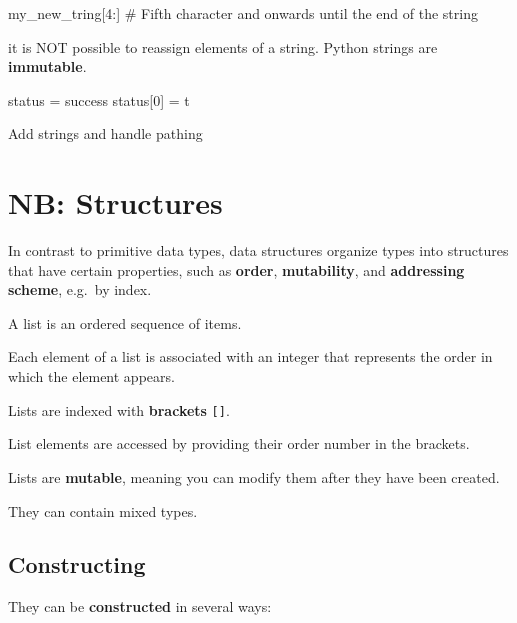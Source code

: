 \documentclass[
  letterpaper,
  DIV=11,
  numbers=noendperiod]{scrreprt}
\newenvironment{Shaded}{\begin{snugshade}}{\end{snugshade}}
\newcommand{\CommentTok}[1]{\textcolor[rgb]{0.37,0.37,0.37}{#1}}
\newcommand{\DecValTok}[1]{\textcolor[rgb]{0.68,0.00,0.00}{#1}}
\newcommand{\NormalTok}[1]{\textcolor[rgb]{0.00,0.23,0.31}{#1}}
\newcommand{\OperatorTok}[1]{\textcolor[rgb]{0.37,0.37,0.37}{#1}}
\newcommand{\StringTok}[1]{\textcolor[rgb]{0.13,0.47,0.30}{#1}}
\begin{document}
\begin{Shaded}
\begin{Highlighting}[]
\NormalTok{my\_new\_tring[}\DecValTok{4}\NormalTok{:]  }\CommentTok{\# Fifth character and onwards until the end of the string}
\end{Highlighting}
\end{Shaded}

it is NOT possible to reassign elements of a string. Python strings are
\textbf{immutable}.

\begin{Shaded}
\begin{Highlighting}[]
\NormalTok{status }\OperatorTok{=} \StringTok{\textquotesingle{}success\textquotesingle{}}
\NormalTok{status[}\DecValTok{0}\NormalTok{] }\OperatorTok{=} \StringTok{\textquotesingle{}t\textquotesingle{}}
\end{Highlighting}
\end{Shaded}

Add strings and handle pathing

\hypertarget{nb-structures}{%
\chapter{NB: Structures}\label{nb-structures}}

In contrast to primitive data types, data structures organize types into
structures that have certain properties, such as \textbf{order},
\textbf{mutability}, and \textbf{addressing scheme}, e.g.~by index.

A list is an ordered sequence of items.

Each element of a list is associated with an integer that represents the
order in which the element appears.

Lists are indexed with \textbf{brackets} \texttt{{[}{]}}.

List elements are accessed by providing their order number in the
brackets.

Lists are \textbf{mutable}, meaning you can modify them after they have
been created.

They can contain mixed types.

\hypertarget{constructing}{%
\section{Constructing}\label{constructing}}

They can be \textbf{constructed} in several ways:
\end{document}
